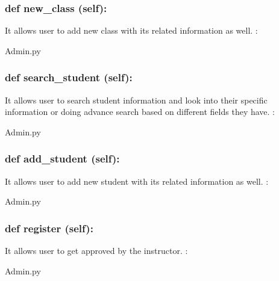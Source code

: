 \hypertarget{class_poly_a14a7ad77ce612b0c54f531d307ee4b39}{
\subsubsection[{def new_class(self):}]{\setlength{\rightskip}{0pt plus 5cm}def {new\_class} (self):}}\label{class_poly_a14a7ad77ce612b0c54f531d307ee4b39}
It allows user to add new class with its related information as well.
:\begin{DoxyCompactItemize}
\item 
Admin.\-py\end{DoxyCompactItemize}

\hypertarget{class_poly_a14a7ad77ce612b0c54f531d307ee4b39}{
\subsubsection[{def search_student(self):}]{\setlength{\rightskip}{0pt plus 5cm}def {search\_student} (self):}}\label{class_poly_a14a7ad77ce612b0c54f531d307ee4b39}
It allows user to search student information and look into their specific information or doing advance search based on different fields they have.
:\begin{DoxyCompactItemize}
\item 
Admin.\-py\end{DoxyCompactItemize}

\hypertarget{class_poly_a14a7ad77ce612b0c54f531d307ee4b39}{
\subsubsection[{def add_student(self):}]{\setlength{\rightskip}{0pt plus 5cm}def {add\_student} (self):}}\label{class_poly_a14a7ad77ce612b0c54f531d307ee4b39}
It allows user to add new student with its related information as well.
:\begin{DoxyCompactItemize}
\item 
Admin.\-py\end{DoxyCompactItemize}

\hypertarget{class_poly_a14a7ad77ce612b0c54f531d307ee4b39}{
\subsubsection[{def register(self):}]{\setlength{\rightskip}{0pt plus 5cm}def {register} (self):}}\label{class_poly_a14a7ad77ce612b0c54f531d307ee4b39}
It allows user to get approved by the instructor.
:\begin{DoxyCompactItemize}
\item 
Admin.\-py\end{DoxyCompactItemize}

